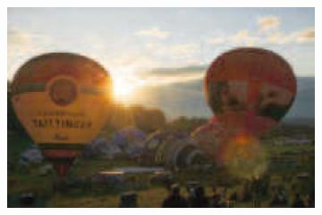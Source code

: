 \documentclass[letterpaper,10pt]{article}
\begin{document}
\begin{figure}[htbp]
\begin{subfigure}{0.11\textwidth}
					\includegraphics[width=\linewidth]{picture/LLIE/Division Gets Better/Ours1}
					\captionsetup{font=scriptsize}
					\label{fig: Ours1}	
				\end{subfigure}\\
				

\end{figure}
\end{document}
